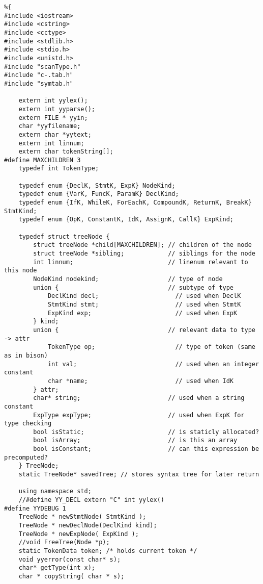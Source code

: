 \documentclass[12pt]{book}
\begin{document}
\lstset{language=java,label= ,caption= ,numbers=none}
\begin{lstlisting}
%{
#include <iostream>
#include <cstring>
#include <cctype>
#include <stdlib.h>
#include <stdio.h>
#include <unistd.h>
#include "scanType.h"  
#include "c-.tab.h"
#include "symtab.h"

    extern int yylex();
    extern int yyparse();
    extern FILE * yyin;
    char *yyfilename;
    extern char *yytext;
    extern int linnum;
    extern char tokenString[];
#define MAXCHILDREN 3
    typedef int TokenType;

    typedef enum {DeclK, StmtK, ExpK} NodeKind; 
    typedef enum {VarK, FuncK, ParamK} DeclKind;
    typedef enum {IfK, WhileK, ForEachK, CompoundK, ReturnK, BreakK} StmtKind;
    typedef enum {OpK, ConstantK, IdK, AssignK, CallK} ExpKind;

    typedef struct treeNode {
        struct treeNode *child[MAXCHILDREN]; // children of the node
        struct treeNode *sibling;            // siblings for the node
        int linnum;                          // linenum relevant to this node
        NodeKind nodekind;                   // type of node
        union {                              // subtype of type 
            DeclKind decl;                     // used when DeclK
            StmtKind stmt;                     // used when StmtK
            ExpKind exp;                       // used when ExpK
        } kind;
        union {                              // relevant data to type -> attr
            TokenType op;                      // type of token (same as in bison)
            int val;                           // used when an integer constant
            char *name;                        // used when IdK
        } attr;                                 
        char* string;                        // used when a string constant
        ExpType expType;                     // used when ExpK for type checking
        bool isStatic;                       // is staticly allocated?
        bool isArray;                        // is this an array
        bool isConstant;                     // can this expression be precomputed?
    } TreeNode;
    static TreeNode* savedTree; // stores syntax tree for later return

    using namespace std;
    //#define YY_DECL extern "C" int yylex()
#define YYDEBUG 1
    TreeNode * newStmtNode( StmtKind );
    TreeNode * newDeclNode(DeclKind kind);
    TreeNode * newExpNode( ExpKind );
    //void FreeTree(Node *p);
    static TokenData token; /* holds current token */
    void yyerror(const char* s);
    char* getType(int x);
    char * copyString( char * s);


\end{lstlisting}
\end{document}

